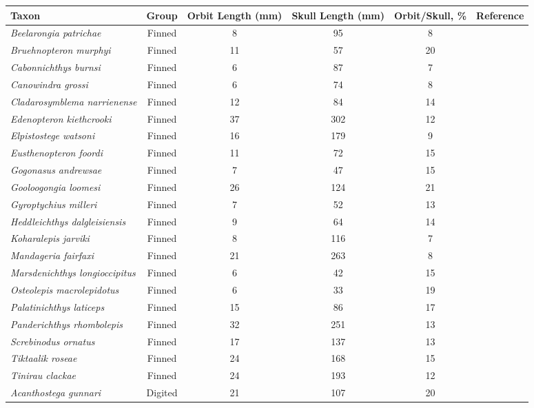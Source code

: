 \begin{tabular}{|L{4.5cm}|c|c|c|c|L{4.5cm}|}
\hline
\textbf{Taxon}&\textbf{Group}&\textbf{Orbit Length (mm)}&\textbf{Skull Length (mm)}&\textbf{Orbit/Skull, \%}&\textbf{Reference}\\\hline
\textit{Beelarongia patrichae}&Finned&8&95&8 &\cite{Long87a}\\\hline
\textit{Bruehnopteron  murphyi}&Finned&11&57&20&\cite{Schu12a}\\\hline
\textit{Cabonnichthys burnsi}&Finned&6&87&7 &\cite{Ahlb97a}\\\hline
\textit{Canowindra grossi}&Finned&6&74&8 &\cite{Long85a}\\\hline
\textit{Cladarosymblema narrienense}&Finned&12&84&14&\cite{Fox95a}\\\hline
\textit{Edenopteron kiethcrooki}&Finned&37&302&12&\cite{Youn13a}\\\hline
\textit{Elpistostege watsoni}&Finned&16&179&9 &\cite{Schu85a}\\\hline
\textit{Eusthenopteron foordi}&Finned&11&72&15&\cite{Mark07a}\\\hline
\textit{Gogonasus andrewsae}&Finned&7&47&15&\cite{Long06a}\\\hline
\textit{Gooloogongia loomesi}&Finned&26&124&21&\cite{Joha98a}\\\hline
\textit{Gyroptychius  milleri}&Finned&7&52&13&\cite{Newm15a}\\\hline
\textit{Heddleichthys dalgleisiensis}&Finned&9&64&14&\cite{Snit09a}\\\hline
\textit{Koharalepis jarviki}&Finned&8&116&7 &\cite{Youn92a}\\\hline
\textit{Mandageria fairfaxi}&Finned&21&263&8 &\cite{Joha97a}\\\hline
\textit{Marsdenichthys longioccipitus}&Finned&6&42&15&\cite{Holl10a}\\\hline
\textit{Osteolepis macrolepidotus}&Finned&6&33&19&\cite{Jarv48a}\\\hline
\textit{Palatinichthys laticeps}&Finned&15&86&17&\cite{Witz12a}\\\hline
\textit{Panderichthys rhombolepis}&Finned&32&251&13&\cite{Voro91a}\\\hline
\textit{Screbinodus ornatus}&Finned&17&137&13&\cite{Jeff12a}\\\hline
\textit{Tiktaalik roseae}&Finned&24&168&15&\cite{Daes06a}\\\hline
\textit{Tinirau clackae}&Finned&24&193&12&\cite{Swar12a}\\\hline
\textit{Acanthostega gunnari}&Digited&21&107&20&\cite{Clac02b,Porr15a}\\\hline

\end{tabular}
